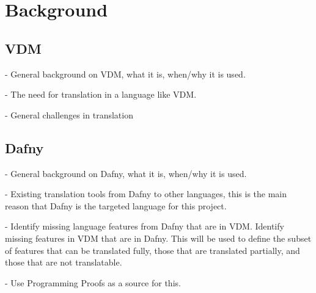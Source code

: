 \documentclass{entcs}
\begin{document}
\section{Background}

\subsection{VDM}
- General background on VDM, what it is, when/why it is used. 

- The need for translation in a language like VDM.

- General challenges in translation 

\subsection{Dafny}

- General background on Dafny, what it is, when/why it is used.

- Existing translation tools from Dafny to other languages, this is the main reason that Dafny is the targeted language for this project. 

- Identify missing language features from Dafny that are in VDM. Identify missing features in VDM that are in Dafny. This will be used to define the subset of features that can be translated fully, those that are translated partially, and those that are not translatable.

- Use Programming Proofs as a source for this.


% 


\end{document}
